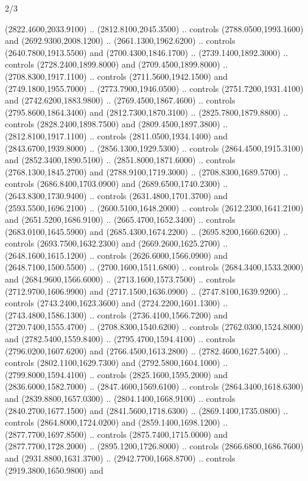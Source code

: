 \begin{flagdescription}{2/3}
\begin{scope}[shift={(0.5\flaglength,0.5)},scale=\flagwidth/130]
\begin{scope}[y=0.01mm, x=0.01mm,shift={(-3365,-2250)}]
  (2822.4600,2033.9100) .. (2812.8100,2045.3500) .. controls
  (2788.0500,1993.1600) and (2692.9300,2008.1200) .. (2661.1300,1962.6200) ..
  controls (2640.7800,1913.5500) and (2700.4300,1846.1700) ..
  (2739.1400,1892.3000) .. controls (2728.2400,1899.8000) and
  (2709.4500,1899.8000) .. (2708.8300,1917.1100) .. controls
  (2711.5600,1942.1500) and (2749.1800,1955.7000) .. (2773.7900,1946.0500) ..
  controls (2751.7200,1931.4100) and (2742.6200,1883.9800) ..
  (2769.4500,1867.4600) .. controls (2795.8600,1864.3400) and
  (2812.7300,1870.3100) .. (2825.7800,1879.8800) .. controls
  (2828.2400,1898.7500) and (2809.4500,1897.3800) .. (2812.8100,1917.1100) ..
  controls (2811.0500,1934.1400) and (2843.6700,1939.8000) ..
  (2856.1300,1929.5300) .. controls (2864.4500,1915.3100) and
  (2852.3400,1890.5100) .. (2851.8000,1871.6000) .. controls
  (2768.1300,1845.2700) and (2788.9100,1719.3000) .. (2708.8300,1689.5700) ..
  controls (2686.8400,1703.0900) and (2689.6500,1740.2300) ..
  (2643.8300,1730.9400) .. controls (2631.4800,1701.3700) and
  (2593.5500,1696.2100) .. (2600.5100,1648.2000) .. controls
  (2612.2300,1641.2100) and (2651.5200,1686.9100) .. (2665.4700,1652.3400) ..
  controls (2683.0100,1645.5900) and (2685.4300,1674.2200) ..
  (2695.8200,1660.6200) .. controls (2693.7500,1632.2300) and
  (2669.2600,1625.2700) .. (2648.1600,1615.1200) .. controls
  (2626.6000,1566.0900) and (2648.7100,1500.5500) .. (2700.1600,1511.6800) ..
  controls (2684.3400,1533.2000) and (2684.9600,1566.6000) ..
  (2713.1600,1573.7500) .. controls (2712.9700,1606.9900) and
  (2717.1500,1636.0900) .. (2747.8100,1639.9200) .. controls
  (2743.2400,1623.3600) and (2724.2200,1601.1300) .. (2743.4800,1586.1300) ..
  controls (2736.4100,1566.7200) and (2720.7400,1555.4700) ..
  (2708.8300,1540.6200) .. controls (2762.0300,1524.8000) and
  (2782.5400,1559.8400) .. (2795.4700,1594.4100) .. controls
  (2796.0200,1607.6200) and (2766.4500,1613.2800) .. (2782.4600,1627.5400) ..
  controls (2802.1100,1629.7300) and (2792.5800,1604.1000) ..
  (2799.8000,1594.4100) .. controls (2825.1600,1595.2000) and
  (2836.6000,1582.7000) .. (2847.4600,1569.6100) .. controls
  (2864.3400,1618.6300) and (2839.8800,1657.0300) .. (2804.1400,1668.9100) ..
  controls (2840.2700,1677.1500) and (2841.5600,1718.6300) ..
  (2869.1400,1735.0800) .. controls (2864.8000,1724.0200) and
  (2859.1400,1698.1200) .. (2877.7700,1697.8500) .. controls
  (2875.7400,1715.0000) and (2877.7700,1728.2000) .. (2895.1200,1726.8000) ..
  controls (2866.6800,1686.7600) and (2931.8800,1631.3700) ..
  (2942.7700,1668.8700) .. controls (2919.3800,1650.9800) and

\end{scope}
\end{scope}
\end{flagdescription}
